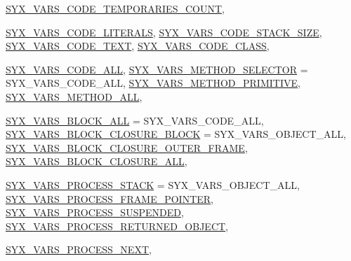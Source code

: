 \begin{CompactItemize}
\hyperlink{syx-enums_8h_c792ce905d7a570f1bf725aafa4d1d9b94ae8106207427d6b21b8fef86fc486d}{SYX\_\-VARS\_\-CODE\_\-TEMPORARIES\_\-COUNT}, 
\par
\hyperlink{syx-enums_8h_c792ce905d7a570f1bf725aafa4d1d9b6f75bb57e1de53105b87e66c59a71bf9}{SYX\_\-VARS\_\-CODE\_\-LITERALS}, 
\hyperlink{syx-enums_8h_c792ce905d7a570f1bf725aafa4d1d9b557a67325e49908a701ce7f6c18a4b1d}{SYX\_\-VARS\_\-CODE\_\-STACK\_\-SIZE}, 
\hyperlink{syx-enums_8h_c792ce905d7a570f1bf725aafa4d1d9b18ca32c7daea3f026fbb098c8f8e4787}{SYX\_\-VARS\_\-CODE\_\-TEXT}, 
\hyperlink{syx-enums_8h_c792ce905d7a570f1bf725aafa4d1d9b70eecc9c822b02760569f63e7680f2ed}{SYX\_\-VARS\_\-CODE\_\-CLASS}, 
\par
\hyperlink{syx-enums_8h_c792ce905d7a570f1bf725aafa4d1d9b5d8e4b7f6f3a74841e7348b7c3daa96d}{SYX\_\-VARS\_\-CODE\_\-ALL}, 
\hyperlink{syx-enums_8h_c792ce905d7a570f1bf725aafa4d1d9b8f4db0d5d47da08e4bf9bd61584ff9c0}{SYX\_\-VARS\_\-METHOD\_\-SELECTOR} =  SYX\_\-VARS\_\-CODE\_\-ALL, 
\hyperlink{syx-enums_8h_c792ce905d7a570f1bf725aafa4d1d9bfe826b5e71bec2d9b8a270d461d4bff8}{SYX\_\-VARS\_\-METHOD\_\-PRIMITIVE}, 
\hyperlink{syx-enums_8h_c792ce905d7a570f1bf725aafa4d1d9bd8822e8830d3864192863932c641a538}{SYX\_\-VARS\_\-METHOD\_\-ALL}, 
\par
\hyperlink{syx-enums_8h_c792ce905d7a570f1bf725aafa4d1d9b238a1002607f38d8e5d7d364ac244d8d}{SYX\_\-VARS\_\-BLOCK\_\-ALL} =  SYX\_\-VARS\_\-CODE\_\-ALL, 
\hyperlink{syx-enums_8h_c792ce905d7a570f1bf725aafa4d1d9bf4bfa34d3a2ae1aaa6743ceeee58e231}{SYX\_\-VARS\_\-BLOCK\_\-CLOSURE\_\-BLOCK} =  SYX\_\-VARS\_\-OBJECT\_\-ALL, 
\hyperlink{syx-enums_8h_c792ce905d7a570f1bf725aafa4d1d9b7eb855e348b00705a6bccd8fa085764c}{SYX\_\-VARS\_\-BLOCK\_\-CLOSURE\_\-OUTER\_\-FRAME}, 
\hyperlink{syx-enums_8h_c792ce905d7a570f1bf725aafa4d1d9b58351c65771353d1b097c7064fe3498c}{SYX\_\-VARS\_\-BLOCK\_\-CLOSURE\_\-ALL}, 
\par
\hyperlink{syx-enums_8h_c792ce905d7a570f1bf725aafa4d1d9b2322532ff6a2ccff90e74637881a1c67}{SYX\_\-VARS\_\-PROCESS\_\-STACK} =  SYX\_\-VARS\_\-OBJECT\_\-ALL, 
\hyperlink{syx-enums_8h_c792ce905d7a570f1bf725aafa4d1d9b0c3e3095b5dd5471cf648b7795d0b258}{SYX\_\-VARS\_\-PROCESS\_\-FRAME\_\-POINTER}, 
\hyperlink{syx-enums_8h_c792ce905d7a570f1bf725aafa4d1d9b26f502a7044be1f189a1e1a84ce28ad6}{SYX\_\-VARS\_\-PROCESS\_\-SUSPENDED}, 
\hyperlink{syx-enums_8h_c792ce905d7a570f1bf725aafa4d1d9b8c50456d393e9e54ecdeddd6283df6bb}{SYX\_\-VARS\_\-PROCESS\_\-RETURNED\_\-OBJECT}, 
\par
\hyperlink{syx-enums_8h_c792ce905d7a570f1bf725aafa4d1d9bec98dcfad3a337969c0efb2b7aec3d0f}{SYX\_\-VARS\_\-PROCESS\_\-NEXT}, 

\end{CompactItemize}
